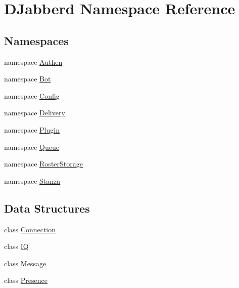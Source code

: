 \hypertarget{namespace_d_jabberd}{
\section{\-D\-Jabberd \-Namespace \-Reference}
\label{namespace_d_jabberd}
}
\subsection*{\-Namespaces}
\begin{DoxyCompactItemize}
\item 
namespace \hyperlink{namespace_d_jabberd_1_1_authen}{\-Authen}
\item 
namespace \hyperlink{namespace_d_jabberd_1_1_bot}{\-Bot}
\item 
namespace \hyperlink{namespace_d_jabberd_1_1_config}{\-Config}
\item 
namespace \hyperlink{namespace_d_jabberd_1_1_delivery}{\-Delivery}
\item 
namespace \hyperlink{namespace_d_jabberd_1_1_plugin}{\-Plugin}
\item 
namespace \hyperlink{namespace_d_jabberd_1_1_queue}{\-Queue}
\item 
namespace \hyperlink{namespace_d_jabberd_1_1_roster_storage}{\-Roster\-Storage}
\item 
namespace \hyperlink{namespace_d_jabberd_1_1_stanza}{\-Stanza}
\end{DoxyCompactItemize}
\subsection*{\-Data \-Structures}
\begin{DoxyCompactItemize}
\item 
class \hyperlink{class_d_jabberd_1_1_connection}{\-Connection}
\item 
class \hyperlink{class_d_jabberd_1_1_i_q}{\-I\-Q}
\item 
class \hyperlink{class_d_jabberd_1_1_message}{\-Message}
\item 
class \hyperlink{class_d_jabberd_1_1_presence}{\-Presence}
\end{DoxyCompactItemize}
